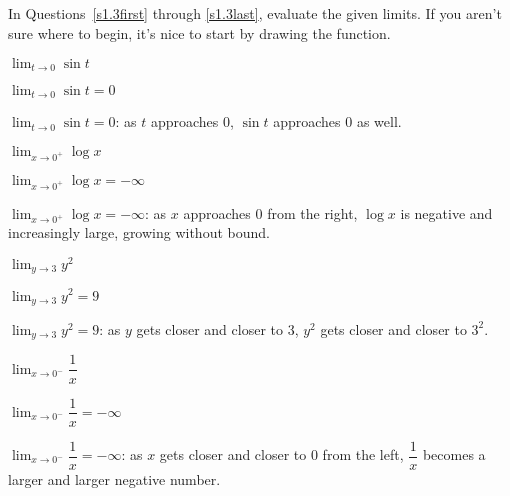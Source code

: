 \subsection*{\Procedural}
In Questions~\ref{s1.3first} through \ref{s1.3last}, evaluate the given limits. If you aren't sure where to begin, it's nice to start by drawing the function.

\begin{question}\label{s1.3first}
$\displaystyle\lim_{t \rightarrow 0} \sin t$
\end{question}
\begin{answer}
$\displaystyle\lim_{t \rightarrow 0} \sin t=0$
\end{answer}
\begin{solution}
$\displaystyle\lim_{t \rightarrow 0} \sin t=0$: as $t$ approaches 0, $\sin t$ approaches 0 as well.
\end{solution}

\begin{question}
$\displaystyle\lim_{x \rightarrow 0^+} \log x$
\end{question}
\begin{answer}
$\displaystyle\lim_{x \rightarrow 0^+} \log x = -\infty$
\end{answer}
\begin{solution}$\displaystyle\lim_{x \rightarrow 0^+} \log x = -\infty$: as $x$ approaches 0 from the right, $\log x$ is negative and increasingly large, growing without bound.
\end{solution}


\begin{question}
$\displaystyle\lim_{y \rightarrow 3} y^2$
\end{question}
\begin{answer}$\displaystyle\lim_{y \rightarrow 3} y^2=9$
\end{answer}
\begin{solution}
$\displaystyle\lim_{y \rightarrow 3} y^2=9$:
as $y$ gets closer and closer to 3, $y^2$ gets closer and closer to $3^2$.
\end{solution}


\begin{question}
$\displaystyle\lim_{x \rightarrow 0^-} \dfrac{1}{x}$
\end{question}
\begin{answer} $\displaystyle\lim_{x \rightarrow 0^-} \dfrac{1}{x}=-\infty$
\end{answer}
\begin{solution} $\displaystyle\lim_{x \rightarrow 0^-} \dfrac{1}{x}=-\infty$:
as $x$ gets closer and closer to 0 from the left, $\dfrac{1}{x}$ becomes a larger and larger negative number.
\end{solution}


